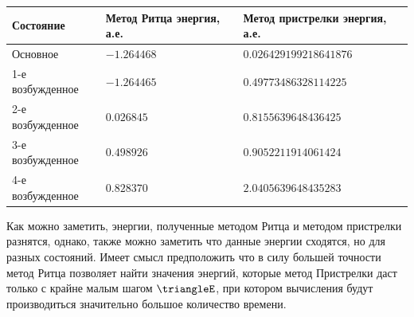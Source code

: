 \begin{table}[H]
    \centering
    \noindent
    \begin{tabularx}{\linewidth}{|X|X|X|}
        \hline
        \textbf{Состояние}&\textbf{Метод Ритца энергия, а.е.}&\textbf{Метод пристрелки энергия, а.е.}\\
        \hline
        Основное & $-1.264468$ & $0.026429199218641876$\\
        \hline
        1-е возбужденное & $-1.264465$ & $0.49773486328114225$\\
        \hline
        2-е возбужденное & $0.026845$ & $0.8155639648436425$\\
        \hline
        3-е возбужденное & $0.498926$ & $0.9052211914061424$\\
        \hline
        4-е возбужденное & $0.828370$ & $2.0405639648435283$\\
        \hline
    \end{tabularx}\label{tab:energies}
\end{table}

Как можно заметить, энергии, полученные методом Ритца и методом пристрелки разнятся, однако,
также можно заметить что данные энергии сходятся, но для разных состояний.
Имеет смысл предположить что в силу большей точности метод Ритца позволяет найти значения энергий,
которые метод Пристрелки даст только с крайне малым шагом $\triangleE$,
при котором вычисления будут производиться значительно большое количество времени.

%
%
\newpage